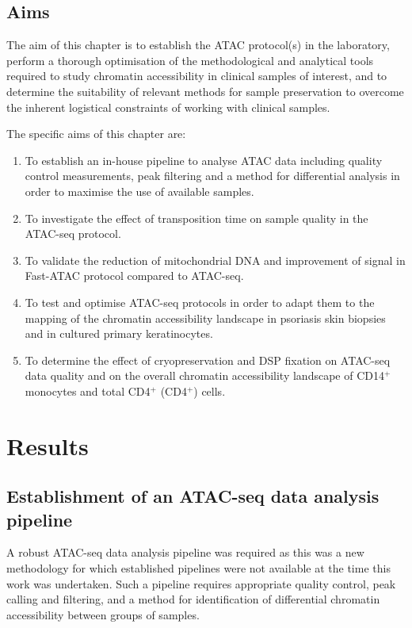 \subsection{Aims}

The aim of this chapter is to establish the ATAC protocol(s) in the laboratory, perform a thorough optimisation of the methodological and analytical tools required to study chromatin accessibility in clinical samples of interest, and to determine the suitability of relevant methods for sample preservation to overcome the inherent logistical constraints of working with clinical samples.
 
The specific aims of this chapter are:
 
\begin{enumerate}
\item To establish an in-house pipeline to analyse ATAC data including quality control measurements, peak filtering and a method for differential analysis in order to maximise the use of available samples.
 
\item To investigate the effect of transposition time on sample quality in the ATAC-seq protocol.
 
\item To validate the reduction of mitochondrial DNA and improvement of signal in Fast-ATAC protocol compared to ATAC-seq.
 
\item To test and optimise ATAC-seq protocols in order to adapt them to the mapping of the chromatin accessibility landscape in psoriasis skin biopsies and in cultured primary keratinocytes.

\item To determine the effect of cryopreservation and DSP fixation on ATAC-seq data quality and on the overall chromatin accessibility landscape of CD14$^+$ monocytes and total CD4$^+$ (CD4$^+$) cells.
\end{enumerate}



\section{Results}
%

\subsection{Establishment of an ATAC-seq data analysis pipeline}
A robust ATAC-seq data analysis pipeline was required as this was a new methodology \parencite{Buenrostro2013} for which established pipelines were not available at the time this work was undertaken. Such a pipeline requires appropriate quality control, peak calling and filtering, and a method for identification of differential chromatin accessibility between groups of samples. 

